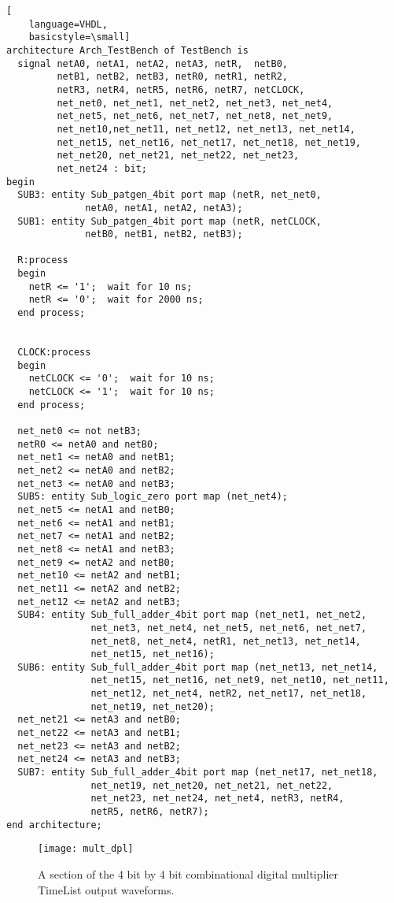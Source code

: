 \begin{lstlisting}[
    language=VHDL,
    basicstyle=\small]
architecture Arch_TestBench of TestBench is
  signal netA0, netA1, netA2, netA3, netR,  netB0,
         netB1, netB2, netB3, netR0, netR1, netR2,
         netR3, netR4, netR5, netR6, netR7, netCLOCK,
         net_net0, net_net1, net_net2, net_net3, net_net4,
         net_net5, net_net6, net_net7, net_net8, net_net9,
         net_net10,net_net11, net_net12, net_net13, net_net14,
         net_net15, net_net16, net_net17, net_net18, net_net19,
         net_net20, net_net21, net_net22, net_net23,
         net_net24 : bit;
begin
  SUB3: entity Sub_patgen_4bit port map (netR, net_net0, 
              netA0, netA1, netA2, netA3);
  SUB1: entity Sub_patgen_4bit port map (netR, netCLOCK, 
              netB0, netB1, netB2, netB3);

  R:process
  begin
    netR <= '1';  wait for 10 ns;
    netR <= '0';  wait for 2000 ns;
  end process;


  CLOCK:process
  begin
    netCLOCK <= '0';  wait for 10 ns;
    netCLOCK <= '1';  wait for 10 ns;
  end process;

  net_net0 <= not netB3;
  netR0 <= netA0 and netB0;
  net_net1 <= netA0 and netB1;
  net_net2 <= netA0 and netB2;
  net_net3 <= netA0 and netB3;
  SUB5: entity Sub_logic_zero port map (net_net4);
  net_net5 <= netA1 and netB0;
  net_net6 <= netA1 and netB1;
  net_net7 <= netA1 and netB2;
  net_net8 <= netA1 and netB3;
  net_net9 <= netA2 and netB0;
  net_net10 <= netA2 and netB1;
  net_net11 <= netA2 and netB2;
  net_net12 <= netA2 and netB3;
  SUB4: entity Sub_full_adder_4bit port map (net_net1, net_net2, 
               net_net3, net_net4, net_net5, net_net6, net_net7, 
               net_net8, net_net4, netR1, net_net13, net_net14, 
               net_net15, net_net16);
  SUB6: entity Sub_full_adder_4bit port map (net_net13, net_net14, 
               net_net15, net_net16, net_net9, net_net10, net_net11, 
               net_net12, net_net4, netR2, net_net17, net_net18, 
               net_net19, net_net20);
  net_net21 <= netA3 and netB0;
  net_net22 <= netA3 and netB1;
  net_net23 <= netA3 and netB2;
  net_net24 <= netA3 and netB3;
  SUB7: entity Sub_full_adder_4bit port map (net_net17, net_net18, 
               net_net19, net_net20, net_net21, net_net22, 
               net_net23, net_net24, net_net4, netR3, netR4, 
               netR5, netR6, netR7);
end architecture;
\end{lstlisting}

\begin{figure}[ht]
  \centering
  \texttt{[image: mult\_dpl]}
  \caption{A section of the 4 bit by 4 bit combinational digital multiplier TimeList output waveforms.}
  \label{fig:mult_dpl}
\end{figure} 

